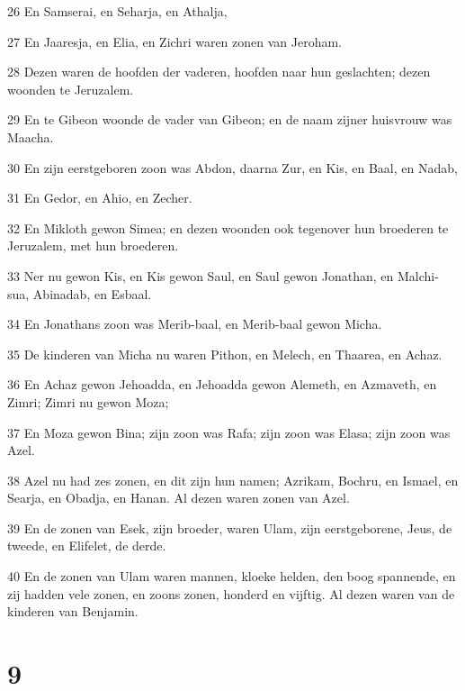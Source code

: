 \par 26 En Samserai, en Seharja, en Athalja,
\par 27 En Jaaresja, en Elia, en Zichri waren zonen van Jeroham.
\par 28 Dezen waren de hoofden der vaderen, hoofden naar hun geslachten; dezen woonden te Jeruzalem.
\par 29 En te Gibeon woonde de vader van Gibeon; en de naam zijner huisvrouw was Maacha.
\par 30 En zijn eerstgeboren zoon was Abdon, daarna Zur, en Kis, en Baal, en Nadab,
\par 31 En Gedor, en Ahio, en Zecher.
\par 32 En Mikloth gewon Simea; en dezen woonden ook tegenover hun broederen te Jeruzalem, met hun broederen.
\par 33 Ner nu gewon Kis, en Kis gewon Saul, en Saul gewon Jonathan, en Malchi-sua, Abinadab, en Esbaal.
\par 34 En Jonathans zoon was Merib-baal, en Merib-baal gewon Micha.
\par 35 De kinderen van Micha nu waren Pithon, en Melech, en Thaarea, en Achaz.
\par 36 En Achaz gewon Jehoadda, en Jehoadda gewon Alemeth, en Azmaveth, en Zimri; Zimri nu gewon Moza;
\par 37 En Moza gewon Bina; zijn zoon was Rafa; zijn zoon was Elasa; zijn zoon was Azel.
\par 38 Azel nu had zes zonen, en dit zijn hun namen; Azrikam, Bochru, en Ismael, en Searja, en Obadja, en Hanan. Al dezen waren zonen van Azel.
\par 39 En de zonen van Esek, zijn broeder, waren Ulam, zijn eerstgeborene, Jeus, de tweede, en Elifelet, de derde.
\par 40 En de zonen van Ulam waren mannen, kloeke helden, den boog spannende, en zij hadden vele zonen, en zoons zonen, honderd en vijftig. Al dezen waren van de kinderen van Benjamin.

\chapter{9}

